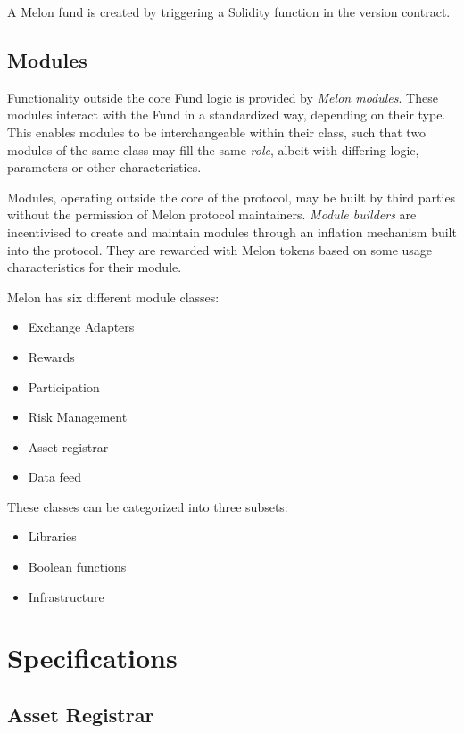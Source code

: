 \documentclass[conference]{IEEEtran}
\begin{document}
A Melon fund is created by triggering a Solidity function in the version contract.

\subsection{Modules}

Functionality outside the core Fund logic is provided by \textit{Melon modules}. These modules interact with the Fund in a standardized way, depending on their type.
This enables modules to be interchangeable within their class, such that two modules of the same class may fill the same \textit{role}, albeit with differing logic, parameters or other characteristics.

Modules, operating outside the core of the protocol, may be built by third parties without the permission of Melon protocol maintainers.
\textit{Module builders} are incentivised to create and maintain modules through an inflation mechanism built into the protocol. 
They are rewarded with Melon tokens based on some usage characteristics for their module.

Melon has six different module classes:

\begin{itemize}
  \item Exchange Adapters
  \item Rewards
  \item Participation
  \item Risk Management
  \item Asset registrar
  \item Data feed
\end{itemize}

These classes can be categorized into three subsets:

\begin{itemize}
  \item Libraries
  \item Boolean functions
  \item Infrastructure
\end{itemize}

\section{Specifications}

\subsection{Asset Registrar}
\end{document}
